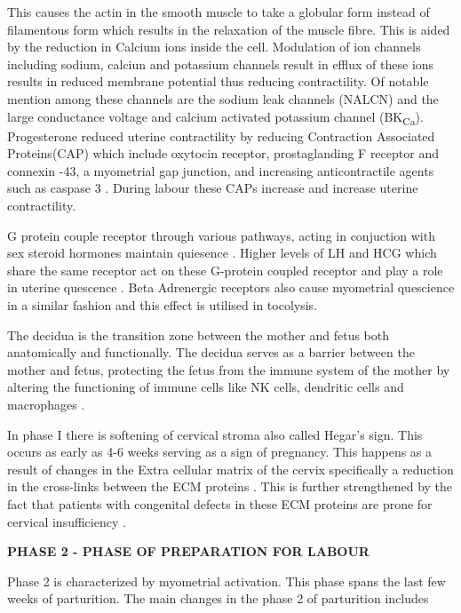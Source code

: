\documentclass[14pt]{extarticle}
\begin{document}
This causes the actin in the smooth muscle to take a globular form instead of filamentous form which results in the relaxation of the muscle fibre. This is aided by the reduction in Calcium ions inside the cell. Modulation of ion channels including sodium, calciun and potassium channels result in efflux of these ions results in reduced membrane potential thus reducing contractility. Of notable mention among these channels are the sodium leak channels (NALCN) and the large conductance voltage and calcium activated potassium channel (BK\textsubscript{Ca}). Progesterone reduced uterine contractility by reducing Contraction Associated Proteins(CAP) which include oxytocin receptor, prostaglanding F receptor and connexin -43, a myometrial gap junction, and increasing anticontractile agents such as caspase 3 \cite{wuProgesteroneReceptorSignaling2017}. During labour these CAPs increase and increase uterine contractility. 

G protein couple receptor through various pathways, acting in conjuction with sex steroid hormones maintain quiesence \cite{priceAdenylylCyclaseIsoforms2000}. Higher levels of LH and HCG which share the same receptor act on these G-protein coupled receptor and play a role in uterine quescence \cite{ambrusNovelRegulationPregnant1994a}. Beta Adrenergic receptors also cause myometrial quescience in a similar fashion and this effect is utilised in tocolysis.

The decidua is the transition zone between the mother and fetus both anatomically and functionally. The decidua serves as a barrier between the mother and fetus, protecting the fetus from the immune system of the mother by altering the functioning of immune cells like NK cells, dendritic cells and macrophages \cite{anderImmuneResponsesMaternalfetal2019}.

In phase I there is softening of cervical stroma also called Hegar's sign. This occurs as early as 4-6 weeks serving as a sign of pregnancy. This happens as a result of changes in the Extra cellular matrix of the cervix \cite{nallasamyDistinctRolesCervical2017} specifically a reduction in the cross-links between the ECM proteins \cite{akinsCervicalSofteningPregnancy2011}. This is further strengthened by the fact that patients with congenital defects in these ECM proteins are prone for cervical insufficiency \cite{anumConnectiveTissueRelated2009}.  


\textbf{PHASE 2 - PHASE OF PREPARATION FOR LABOUR}     

Phase 2 is characterized by myometrial activation. This phase spans the last few weeks of parturition. The main changes in the phase 2 of parturition includes 
\end{document}

